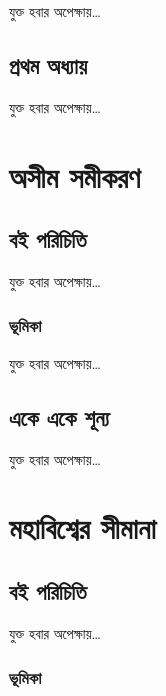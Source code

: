 \documentclass[
]{book}
\begin{document}
যুক্ত হবার অপেক্ষায়\ldots{}

\hypertarget{thinking-about-universe}{%
\section{প্রথম অধ্যায়}\label{thinking-about-universe}}

যুক্ত হবার অপেক্ষায়\ldots{}

\hypertarget{os}{%
\chapter{অসীম সমীকরণ}\label{os}}

\hypertarget{os-about}{%
\section*{বই পরিচিতি}\label{os-about}}

যুক্ত হবার অপেক্ষায়\ldots{}

\hypertarget{os-intro}{%
\subsection*{ভূমিকা}\label{os-intro}}

যুক্ত হবার অপেক্ষায়\ldots{}

\hypertarget{os1-1-0}{%
\section{একে একে শূন্য}\label{os1-1-0}}

যুক্ত হবার অপেক্ষায়\ldots{}

\hypertarget{ms}{%
\chapter{মহাবিশ্বের সীমানা}\label{ms}}

\hypertarget{ms-about}{%
\section*{বই পরিচিতি}\label{ms-about}}

যুক্ত হবার অপেক্ষায়\ldots{}

\hypertarget{ms-intro}{%
\subsection*{ভূমিকা}\label{ms-intro}}
\end{document}
